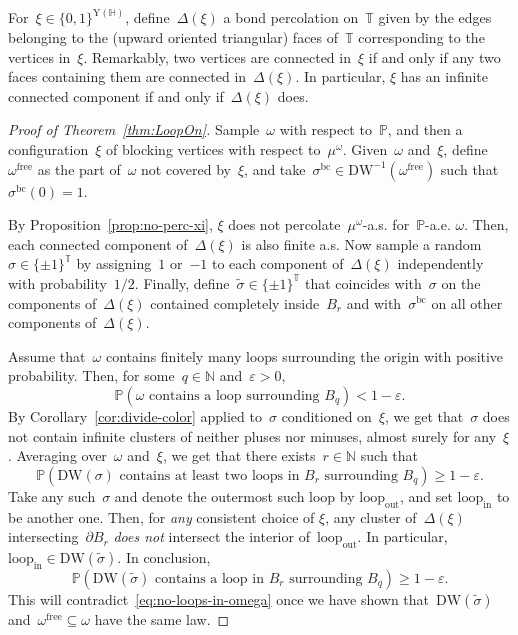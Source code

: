 \documentclass[11pt,letterpaper]{amsart}
\newcounter{n}
\numberwithin{n}{section}
\theoremstyle{plain}
\theoremstyle{definition}
\theoremstyle{remark}
\newcommand\T{\mathbb T}
\renewcommand\P{\mathbb P}
\newcommand\N{\mathbb N}
\newcommand\hexlattice{{\mathbb H}}
\newcommand\upvert{\mathrm{Y}} %
\newcommand{\1}{\mathbbm{1}}
\newcommand\ballloop{B}
\renewcommand\subset\subseteq
\begin{document}
For~$\xi\in \{0,1\}^{\upvert(\hexlattice)}$, define~$\Delta(\xi)$ a bond percolation on~$\T$ given by the edges belonging to the (upward oriented triangular) faces of~$\T$ corresponding to the vertices in~$\xi$.
Remarkably, two vertices are connected in~$\xi$ if and only if any two faces containing them are connected in~$\Delta(\xi)$.
In particular, $\xi$ has an infinite connected component if and only if~$\Delta(\xi)$ does.

\begin{proof}[Proof of Theorem~\ref{thm:LoopOn}]

	Sample~$\omega$ with respect to~$\P$, and then a configuration~$\xi$ of blocking vertices with respect to~$\mu^\omega$.
	Given~$\omega$ and~$\xi$, define~$\omega^{\mathrm{free}}$ as the part of~$\omega$ not covered by~$\xi$, and take~$\sigma^{\mathrm{bc}}\in \mathrm{DW}^{-1}(\omega^{\mathrm{free}})$ such that~$\sigma^{\mathrm{bc}}(0)=1$.
	
	By Proposition~\ref{prop:no-perc-xi}, $\xi$ does not percolate~$\mu^\omega$-a.s. for~$\P$-a.e. $\omega$.
	Then, each connected component of~$\Delta(\xi)$ is also finite a.s.
	Now sample a random~$\sigma\in\{\pm 1\}^\T$ by assigning~$1$ or~$-1$ to each component of~$\Delta(\xi)$ independently with probability~$1/2$.
	Finally, define~$\tilde{\sigma} \in\{\pm 1\}^\T$ that coincides with~$\sigma$ on the components of~$\Delta(\xi)$ contained completely inside~$\ballloop_r$ and with~$\sigma^{\mathrm{bc}}$ on all other components of~$\Delta(\xi)$.
	
	Assume that~$\omega$ contains finitely many loops surrounding the origin with positive probability.
	Then, for some~$q\in\N$ and~$\varepsilon>0$, 
	\begin{equation}\label{eq:no-loops-in-omega}
		\P(\omega \text{ contains a loop surrounding } \ballloop_q) < 1-\varepsilon.
	\end{equation}
	By Corollary~\ref{cor:divide-color} applied to~$\sigma$ conditioned on~$\xi$, we get that~$\sigma$ does not contain infinite clusters of neither pluses nor minuses, almost surely for any~$\xi$.
	Averaging over~$\omega$ and~$\xi$, we get that there exists~$r\in \N$ such that
	\[
		\P\left(\mathrm{DW}(\sigma) \text{ contains at least two loops in } \ballloop_r \text{ surrounding } \ballloop_q \right) \geq 1-\varepsilon.
	\]
	Take any such~$\sigma$ and denote the outermost such loop by $\mathrm{loop}_\mathrm{out}$, and set $\mathrm{loop}_\mathrm{in}$ to be another one. 
	Then, for {\em any} consistent choice of $\xi$,  any cluster of~$\Delta(\xi)$ intersecting~$\partial\ballloop_r$ {\em does not} intersect the interior of~$\mathrm{loop}_\mathrm{out}$. In particular, $\mathrm{loop}_\mathrm{in} \in \mathrm{DW}(\tilde{\sigma})$.
	In conclusion,
	\begin{equation}\label{eq:SigmatildeCoupling}
		\P\left(\mathrm{DW}(\tilde{\sigma}) \text{ contains a loop in } \ballloop_r \text{ surrounding } \ballloop_q \right) \geq 1-\varepsilon.
	\end{equation}
	This will contradict~\eqref{eq:no-loops-in-omega} once we have shown that~$\mathrm{DW}(\tilde{\sigma})$ and~$\omega^{\mathrm{free}}\subset\omega$ have the same law.


\end{proof}
\end{document}
